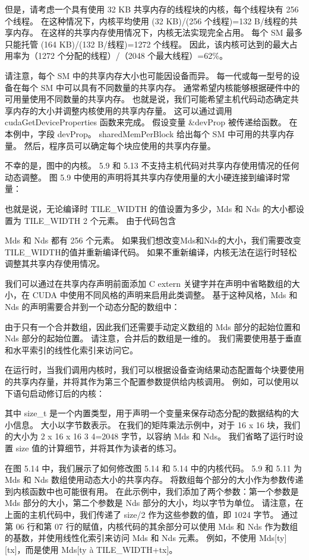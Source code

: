 但是，请考虑一个具有使用 32 KB 共享内存的线程块的内核，每个线程块有 256 个线程。 在这种情况下，内核平均使用 (32 KB)/(256 个线程)=132 B/线程的共享内存。 在这样的共享内存使用情况下，内核无法实现完全占用。 每个 SM 最多只能托管 (164 KB)/(132 B/线程)=1272 个线程。 因此，该内核可达到的最大占用率为（1272 个分配的线程）/（2048 个最大线程）=62\%。

请注意，每个 SM 中的共享内存大小也可能因设备而异。 每一代或每一型号的设备在每个 SM 中可以具有不同数量的共享内存。 通常希望内核能够根据硬件中的可用量使用不同数量的共享内存。 也就是说，我们可能希望主机代码动态确定共享内存的大小并调整内核使用的共享内存量。 这可以通过调用 cudaGetDeviceProperties 函数来完成。 假设变量 \&devProp 被传递给函数。 在本例中，字段 devProp。 sharedMemPerBlock 给出每个 SM 中可用的共享内存量。 然后，程序员可以确定每个块应使用的共享内存量。

不幸的是，图中的内核。 5.9 和 5.13 不支持主机代码对共享内存使用情况的任何动态调整。 图 5.9 中使用的声明将其共享内存使用量的大小硬连接到编译时常量：

也就是说，无论编译时 TILE\_WIDTH 的值设置为多少，Mds 和 Nds 的大小都设置为 TILE\_WIDTH 2 个元素。 由于代码包含

Mds 和 Nds 都有 256 个元素。 如果我们想改变Mds和Nds的大小，我们需要改变TILE\_WIDTH的值并重新编译代码。 如果不重新编译，内核无法在运行时轻松调整其共享内存使用情况。

我们可以通过在共享内存声明前面添加 C extern 关键字并在声明中省略数组的大小，在 CUDA 中使用不同风格的声明来启用此类调整。 基于这种风格，Mds 和 Nds 的声明需要合并到一个动态分配的数组中：

由于只有一个合并数组，因此我们还需要手动定义数组的 Mds 部分的起始位置和 Nds 部分的起始位置。 请注意，合并后的数组是一维的。 我们需要使用基于垂直和水平索引的线性化索引来访问它。

在运行时，当我们调用内核时，我们可以根据设备查询结果动态配置每个块要使用的共享内存量，并将其作为第三个配置参数提供给内核调用。 例如，可以使用以下语句启动修订后的内核：

其中 size\_t 是一个内置类型，用于声明一个变量来保存动态分配的数据结构的大小信息。 大小以字节数表示。 在我们的矩阵乘法示例中，对于 16 x 16 块，我们的大小为 2 x 16 x 16 3 4=2048 字节，以容纳 Mds 和 Nds。 我们省略了运行时设置 size 值的计算细节，并将其作为读者的练习。

在图 5.14 中，我们展示了如何修改图 5.14 和 5.14 中的内核代码。 5.9 和 5.11 为 Mds 和 Nds 数组使用动态大小的共享内存。 将数组每个部分的大小作为参数传递到内核函数中也可能很有用。 在此示例中，我们添加了两个参数：第一个参数是 Mds 部分的大小，第二个参数是 Nds 部分的大小，均以字节为单位。 请注意，在上面的主机代码中，我们传递了 size/2 作为这些参数的值，即 1024 字节。 通过第 06 行和第 07 行的赋值，内核代码的其余部分可以使用 Mds 和 Nds 作为数组的基数，并使用线性化索引来访问 Mds 和 Nds 元素。 例如，不使用 Mds[ty][tx]，而是使用 Mds[ty à TILE\_WIDTH+tx]。


